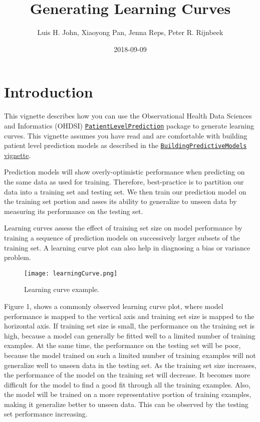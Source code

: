 \documentclass[]{article}
\title{Generating Learning Curves}
\author{Luis H. John, Xiaoyong Pan, Jenna Reps, Peter R. Rijnbeek}
\date{2018-09-09}
\begin{document}
\maketitle

{
\setcounter{tocdepth}{2}
\tableofcontents
}
\section{Introduction}\label{introduction}

This vignette describes how you can use the Observational Health Data
Sciences and Informatics (OHDSI)
\href{http://github.com/OHDSI/PatientLevelPrediction}{\texttt{PatientLevelPrediction}}
package to generate learning curves. This vignette assumes you have read
and are comfortable with building patient level prediction models as
described in the
\href{https://github.com/OHDSI/PatientLevelPrediction/blob/master/inst/doc/BuildingPredictiveModels.pdf}{\texttt{BuildingPredictiveModels}
vignette}.

Prediction models will show overly-optimistic performance when
predicting on the same data as used for training. Therefore,
best-practice is to partition our data into a training set and testing
set. We then train our prediction model on the training set portion and
asses its ability to generalize to unseen data by measuring its
performance on the testing set.

Learning curves assess the effect of training set size on model
performance by training a sequence of prediction models on successively
larger subsets of the training set. A learning curve plot can also help
in diagnosing a bias or variance problem.

\begin{figure}
\centering
\texttt{[image: learningCurve.png]}
\caption{Learning curve example.}
\end{figure}

Figure 1, shows a commonly observed learning curve plot, where model
performance is mapped to the vertical axis and training set size is
mapped to the horizontal axis. If training set size is small, the
performance on the training set is high, because a model can generally
be fitted well to a limited number of training examples. At the same
time, the performance on the testing set will be poor, because the model
trained on such a limited number of training examples will not
generalize well to unseen data in the testing set. As the training set
size increases, the performance of the model on the training set will
decrease. It becomes more difficult for the model to find a good fit
through all the training examples. Also, the model will be trained on a
more representative portion of training examples, making it generalize
better to unseen data. This can be observed by the testing set
performance increasing.
\end{document}
